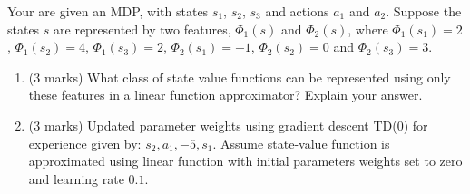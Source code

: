 \documentclass[addpoints,12pt,solution]{exam}
\begin{document}
\begin{questions}
\begin{enumerate}[label=(\alph*)]
\begin{solution}
    \end{solution}
\end{enumerate}

 Your are given an MDP, with states $s_1$, $s_2$, $s_3$ and actions $a_1$ and $a_2$. Suppose the states $s$ are represented by two features, $\Phi_1(s)$ and $\Phi_2(s)$, where $\Phi_1(s_1) = 2$, $\Phi_1(s_2) = 4$, $\Phi_1(s_3) = 2$, $\Phi_2(s_1) = -1$, $\Phi_2(s_2)=0$ and $\Phi_2(s_3)=3$.
\begin{enumerate}
    \item (3 marks) What class of state value functions can be represented using only these features in a linear function approximator? Explain your answer.
    \begin{solution}
        
    \end{solution}
    \item (3 marks) Updated parameter weights using gradient descent TD(0) for experience given by: $s_2, a_1, -5, s_1$. Assume state-value function is approximated using linear function with initial parameters weights set to zero and learning rate $0.1$.
    \begin{solution}
        
    \end{solution}
\end{enumerate}

\end{questions}
\end{document}
